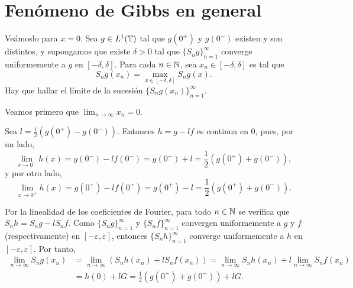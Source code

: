 \documentclass[a4paper, 12pt, oneside]{book}
\begin{document}
\section{Fenómeno de Gibbs en general}

Veámoslo para $x = 0$. Sea $g \in L^1(\mathbb T)$ tal que $g(0^+)$ y $g(0^-)$ existen y son distintos, y supongamos que existe $\delta > 0$ tal que $\{S_ng\}_{n=1}^\infty$ converge uniformemente a $g$ en $[-\delta,\delta]$. Para cada $n \in \mathbb N$, sea $x_n \in [-\delta,\delta]$ es tal que
\[S_ng(x_n) = \max_{x \in [-\delta,\delta]}S_ng(x).\]
Hay que hallar el límite de la sucesión $\{S_ng(x_n)\}_{n=1}^\infty$.

Veamos primero que $\lim_{n\to\infty} x_n = 0$.

Sea $l = \frac{1}{2}(g(0^+)-g(0^-))$. Entonces $h = g-lf$ es continua en $0$, pues, por un lado,
\[\lim_{x\to 0^-} h(x) = g(0^-) - lf(0^-) = g(0^-)+l = \frac{1}{2}(g(0^+)+g(0^-)),\]
y por otro lado,
\[\lim_{x\to 0^+} h(x) = g(0^+) - lf(0^+) = g(0^+)-l = \frac{1}{2}(g(0^+)+g(0^-)).\]

Por la linealidad de los coeficientes de Fourier, para todo $n \in \mathbb N$ se verifica que $S_nh = S_ng-lS_nf$. Como $\{S_ng\}_{n=1}^\infty$ y $\{S_nf\}_{n=1}^\infty$ convergen uniformemente a $g$ y $f$ (respectivamente) en $[-\varepsilon,\varepsilon]$, entonces $\{S_nh\}_{n=1}^\infty$ converge uniformemente a $h$ en $[-\varepsilon,\varepsilon]$. Por tanto,
\begin{align*}
    \lim_{n\to\infty} S_ng(x_n) &=\lim_{n\to\infty}(S_nh(x_n)+lS_nf(x_n)) = \lim_{n\to\infty}S_nh(x_n)+l\lim_{n\to\infty}S_nf(x_n) \\
    &= h(0)+lG = \frac{1}{2}(g(0^+)+g(0^-))+lG.
\end{align*}




\end{document}
